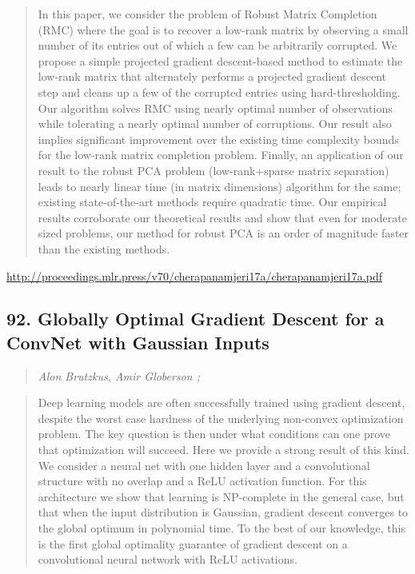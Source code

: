 \documentclass{article}
\begin{document}
\begin{quote}
    In this paper, we consider the problem of Robust Matrix Completion (RMC) where the goal is to recover a low-rank matrix by observing a small number of its entries out of which a few can be arbitrarily corrupted. We propose a simple projected gradient descent-based method to estimate the low-rank matrix that alternately performs a projected gradient descent step and cleans up a few of the corrupted entries using hard-thresholding. Our algorithm solves RMC using nearly optimal number of observations while tolerating a nearly optimal number of corruptions. Our result also implies significant improvement over the existing time complexity bounds for the low-rank matrix completion problem. Finally, an application of our result to the robust PCA problem (low-rank+sparse matrix separation) leads to nearly linear time (in matrix dimensions) algorithm for the same; existing state-of-the-art methods require quadratic time. Our empirical results corroborate our theoretical results and show that even for moderate sized problems, our method for robust PCA is an order of magnitude faster than the existing methods.  \end{quote}

\href{http://proceedings.mlr.press/v70/cherapanamjeri17a/cherapanamjeri17a.pdf}{http://proceedings.mlr.press/v70/cherapanamjeri17a/cherapanamjeri17a.pdf}

\subsection{92. Globally Optimal Gradient Descent for a ConvNet with Gaussian Inputs}

\begin{quote}
\footnotesize{\textit{Alon Brutzkus, Amir Globerson ;}}
\end{quote}

\begin{quote}
    Deep learning models are often successfully trained using gradient descent, despite the worst case hardness of the underlying non-convex optimization problem. The key question is then under what conditions can one prove that optimization will succeed. Here we provide a strong result of this kind. We consider a neural net with one hidden layer and a convolutional structure with no overlap and a ReLU activation function. For this architecture we show that learning is NP-complete in the general case, but that when the input distribution is Gaussian, gradient descent converges to the global optimum in polynomial time. To the best of our knowledge, this is the first global optimality guarantee of gradient descent on a convolutional neural network with ReLU activations.  \end{quote}
\end{document}
